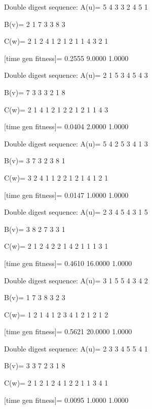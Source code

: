 Double digest sequence:
A(u)=
     5     4     3     3     2     4     5     1

B(v)=
     2     1     7     3     3     8     3

C(w)=
     2     1     2     4     1     2     1     2     1     1     4     3     2     1

[time gen fitness]=
    0.2555    9.0000    1.0000

Double digest sequence:
A(u)=
     2     1     5     3     4     5     4     3

B(v)=
     7     3     3     3     2     1     8

C(w)=
     2     1     4     1     2     1     2     2     1     2     1     1     4     3

[time gen fitness]=
    0.0404    2.0000    1.0000

Double digest sequence:
A(u)=
     5     4     2     5     3     4     1     3

B(v)=
     3     7     3     2     3     8     1

C(w)=
     3     2     4     1     1     2     2     1     2     1     4     1     2     1

[time gen fitness]=
    0.0147    1.0000    1.0000

Double digest sequence:
A(u)=
     2     3     4     5     4     3     1     5

B(v)=
     3     8     2     7     3     3     1

C(w)=
     2     1     2     4     2     2     1     4     2     1     1     1     3     1

[time gen fitness]=
    0.4610   16.0000    1.0000

Double digest sequence:
A(u)=
     3     1     5     5     4     3     4     2

B(v)=
     1     7     3     8     3     2     3

C(w)=
     1     2     1     4     1     2     3     4     1     2     1     2     1     2

[time gen fitness]=
    0.5621   20.0000    1.0000

Double digest sequence:
A(u)=
     2     3     3     4     5     5     4     1

B(v)=
     3     3     7     2     3     1     8

C(w)=
     2     1     2     1     2     4     1     2     2     1     1     3     4     1

[time gen fitness]=
    0.0095    1.0000    1.0000

